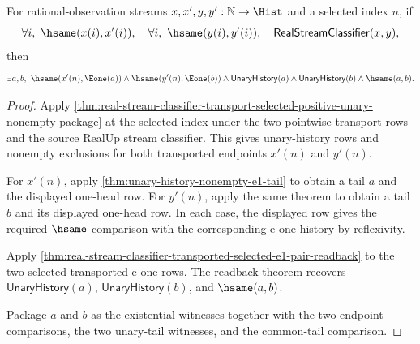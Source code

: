 \begin{theorem}
\label{thm:real-stream-classifier-transported-selected-endpoint-common-e1-tail-readback}
For rational-observation streams $x,x',y,y':\mathbb{N}\to\Hist$ and a selected
index $n$, if
$$
\forall i,\ \hsame(x(i),x'(i)),\quad
\forall i,\ \hsame(y(i),y'(i)),\quad
\mathsf{RealStreamClassifier}(x,y),
$$
then
$$
\exists a,b,\ \hsame(x'(n),\Eone(a))\land\hsame(y'(n),\Eone(b))\land
\mathsf{UnaryHistory}(a)\land\mathsf{UnaryHistory}(b)\land\hsame(a,b).
$$
\end{theorem}
\begin{proof}
Apply
\autoref{thm:real-stream-classifier-transport-selected-positive-unary-nonempty-package}
at the selected index under the two pointwise transport rows and the source
RealUp stream classifier. This gives unary-history rows and nonempty exclusions
for both transported endpoints $x'(n)$ and $y'(n)$.

For $x'(n)$, apply \autoref{thm:unary-history-nonempty-e1-tail} to obtain a tail
$a$ and the displayed one-head row. For $y'(n)$, apply the same theorem to obtain
a tail $b$ and its displayed one-head row. In each case, the displayed row gives
the required $\hsame$ comparison with the corresponding e-one history by
reflexivity.

Apply
\autoref{thm:real-stream-classifier-transported-selected-e1-pair-readback} to the
two selected transported e-one rows. The readback theorem recovers
$\mathsf{UnaryHistory}(a)$, $\mathsf{UnaryHistory}(b)$, and $\hsame(a,b)$.

Package $a$ and $b$ as the existential witnesses together with the two endpoint
comparisons, the two unary-tail witnesses, and the common-tail comparison.
\end{proof}

